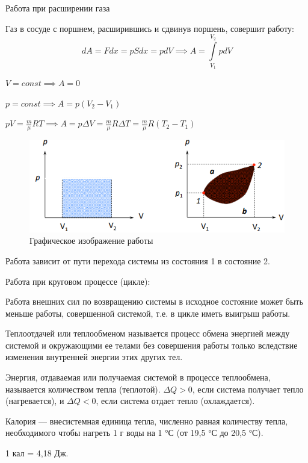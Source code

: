 Работа при расширении газа

Газ в сосуде с поршнем, расширившись и сдвинув поршень, совершит работу: 
$$dA = Fdx = pSdx = pdV \implies A = \int\limits_{V_1}^{V_2} pdV$$

$V = const \implies A = 0$

$p = const \implies A = p(V_2-V_1)$

$pV=\frac{m}{\mu}RT \implies A = p\Delta V = \frac{m}{\mu}R\Delta T = \frac{m}{\mu} R(T_2-T_1)$

\begin{figure}[h]
    \centering
    \includegraphics[width=0.5\linewidth]{imgs/q14i1.png}
    \caption{Графическое изображение работы}
\end{figure}

Работа зависит от пути перехода системы из состояния 1 в состояние 2.

Работа при круговом процессе (цикле):

Работа внешних сил по возвращению системы в исходное состояние 
может быть меньше работы, совершенной системой, т.е. в цикле иметь 
выигрыш работы.

\begin{definition}
    Теплоотдачей или теплообменом называется процесс обмена энергией 
    между системой и окружающими ее телами без совершения работы 
    только вследствие изменения внутренней энергии этих других тел.
\end{definition}

\begin{definition}
    Энергия, отдаваемая или получаемая системой в процессе теплообмена, 
    называется количеством тепла (теплотой). 
    $\Delta Q > 0$, если система получает тепло (нагревается), и 
    $\Delta Q < 0$, если система отдает тепло (охлаждается). 
\end{definition}

\begin{definition}
    Калория — внесистемная единица тепла, численно равная количеству 
    тепла, необходимого чтобы нагреть 1 г воды на 1 °С (от 19,5 °С до 20,5 °С). 

    1 кал = 4,18 Дж. 
\end{definition}

